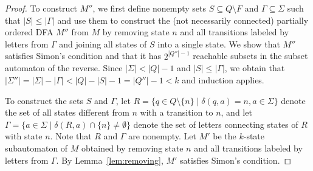 \documentclass[runningheads]{llncs}
\begin{document}
\begin{proof}
    To construct $M''$, we first define nonempty sets $S\subseteq Q\setminus F$ and $\Gamma\subseteq\Sigma$ such that $|S|\le|\Gamma|$ and use them to construct the (not necessarily connected) partially ordered DFA $M''$ from $M$ by removing state $n$ and all transitions labeled by letters from $\Gamma$ and joining all states of $S$ into a single state. We show that $M''$ satisfies Simon's condition and that it has $2^{|Q''|-1}$ reachable subsets in the subset automaton of the reverse. Since $|\Sigma|<|Q|-1$ and $|S|\le|\Gamma|$, we obtain that $|\Sigma''|=|\Sigma|-|\Gamma| < |Q|-|S|-1=|Q''|-1<k$ and induction applies.
    
    To construct the sets $S$ and $\Gamma$, 
    let $R=\{q\in Q\setminus\{n\} \mid \delta(q,a)=n, a\in\Sigma\}$ denote the set of all states different from $n$ with a transition to $n$,
    and let $\Gamma=\{a\in\Sigma \mid \delta(R,a)\cap\{n\}\neq\emptyset\}$ denote the set of letters connecting states of $R$ with state $n$.
    Note that $R$ and $\Gamma$ are nonempty.
    Let $M'$ be the $k$-state subautomaton of $M$ obtained by removing state $n$
    and all transitions labeled by letters from $\Gamma$.
    By Lemma~\ref{lem:removing}, $M'$ satisfies Simon's condition.
    

\end{proof}
\end{document}
